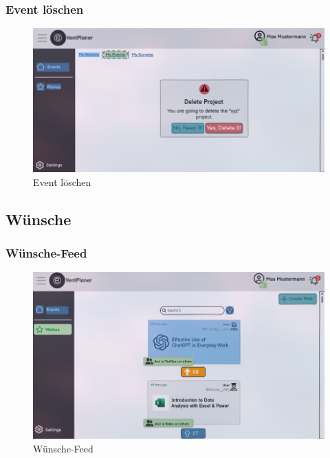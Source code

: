 \documentclass[a4paper,12pt]{article}
\begin{document}
\subsubsection{Event löschen}
\begin{figure}[H]
    \centering
    \includegraphics[width=1\textwidth]{Abbildungen/events/delete_event.png}
    \caption{Event löschen}
    \label{fig:delet_event}
\end{figure}

\subsection{Wünsche}
\subsubsection{Wünsche-Feed}
\begin{figure}[H]
    \centering
    \includegraphics[width=1\textwidth]{Abbildungen/wishes/wishes-feed.png}
    \caption{Wünsche-Feed}
    \label{fig:wishes-feed}
\end{figure}
\end{document}
